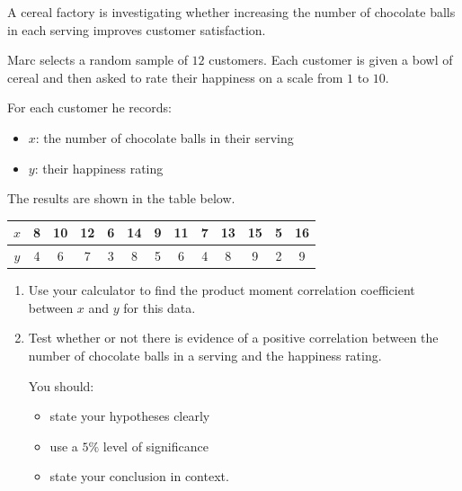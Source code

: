 \begin{example}
A cereal factory is investigating whether increasing the number of chocolate balls in each serving improves customer satisfaction.

Marc selects a random sample of $12$ customers. Each customer is given a bowl of cereal and then asked to rate their happiness on a scale from $1$ to $10$.

For each customer he records:
\begin{itemize}
\item $x$: the number of chocolate balls in their serving
\item $y$: their happiness rating
\end{itemize}

The results are shown in the table below.

\begin{center}
\begin{tabular}{c|cccccccccccc}
$x$ & 8 & 10 & 12 & 6 & 14 & 9 & 11 & 7 & 13 & 15 & 5 & 16 \\
\hline
$y$ & 4 & 6 & 7 & 3 & 8 & 5 & 6 & 4 & 8 & 9 & 2 & 9
\end{tabular}
\end{center}

\begin{enumerate}

\item Use your calculator to find the product moment correlation coefficient between $x$ and $y$ for this data.

\item Test whether or not there is evidence of a positive correlation between the number of chocolate balls in a serving and the happiness rating.

You should:
\begin{itemize}
\item state your hypotheses clearly
\item use a $5\%$ level of significance
\item state your conclusion in context.
\end{itemize}

\end{enumerate}
\end{example}

